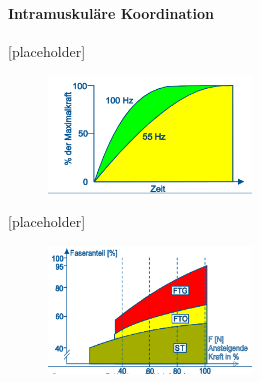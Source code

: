 \paragraph{Intramuskuläre Koordination}

[placeholder] %
\begin{figure}
  \begin{center}
    \includegraphics[width=0.48\textwidth]{pictures/frequenzierung}
  \end{center}
\end{figure}

[placeholder] %
\begin{figure}
  \begin{center}
    \includegraphics[width=0.48\textwidth]{pictures/rekrutierung}
  \end{center}
\end{figure}

